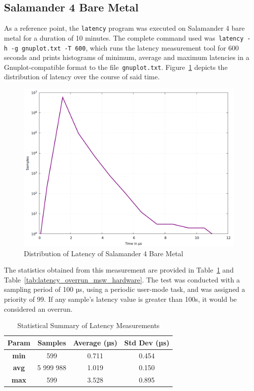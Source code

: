 \documentclass[MMR,Master,english]{twbook}
\begin{document}
\subsection{Salamander 4 Bare Metal}\label{subsec:salamander4-bare-metal}
As a reference point, the \texttt{latency} program was executed on Salamander 4 bare metal for a duration of 10 minutes. The complete command used was~\texttt{latency -h -g gnuplot.txt -T 600}, which runs the latency measurement tool for 600 seconds and prints histograms of minimum, average and maximum latencies in a Gnuplot-compatible format to the file~\texttt{gnuplot.txt}. Figure~\ref{fig:gnuplot_max_latency_hardware} depicts the distribution of latency over the course of said time.

\begin{figure}[H]
	\centering
	\includegraphics[width=0.7\columnwidth]{masterthesis-documentation/docs/sigmatek/xenomai/0hardware/gnuplot_max_latency_hardware.png}
	\caption[Distribution of Latency of Salamander 4 Bare Metal]{Distribution of Latency of Salamander 4 Bare Metal}
	\label{fig:gnuplot_max_latency_hardware}
\end{figure}

\noindent The statistics obtained from this measurement are provided in Table~\ref{tab:latency_stats_hardware} and Table~\ref{tab:latency_overrun_msw_hardware}. The test was conducted with a sampling period of 100 µs, using a periodic user-mode task, and was assigned a priority of 99.
If any sample’s latency value is greater than 100\textmu s, it would be considered an overrun.

\begin{table}[H]
	\centering
	\caption{Statistical Summary of Latency Measurements}
	\label{tab:latency_stats_hardware}
	\begin{tabular}{|c|c|c|c|}
		\hline
		\textbf{Param} & \textbf{Samples} & \textbf{Average (µs)} & \textbf{Std Dev (µs)} \\ \hline
		\textbf{min}   & 599              & 0.711                 & 0.454                 \\ \hline
		\textbf{avg}   & 5 999 988        & 1.019                 & 0.150                 \\ \hline
		\textbf{max}   & 599              & 3.528                 & 0.895                 \\ \hline
	\end{tabular}
\end{table}
\end{document}
